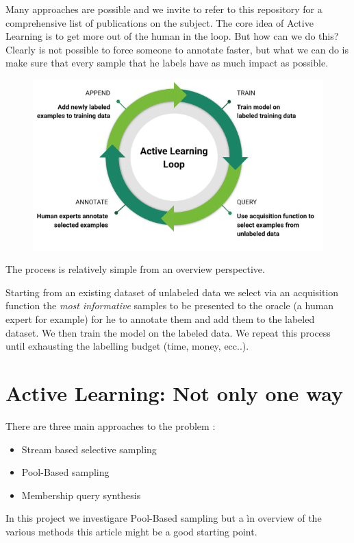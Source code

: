 \documentclass{article}
\begin{document}
\begin{flushleft}
Many approaches are possible and we invite to refer to this repository for a comprehensive list of publications on the subject.
The core idea of Active Learning is to get more out of the human in the loop.
But how can we do this?
Clearly is not possible to force someone to annotate faster, but what we can do is make sure 
that every sample that he labels have as much impact as possible.


\begin{figure}[h]
    \centering
    \includegraphics[scale=0.5]{AL-loop}
\end{figure}

The process is relatively simple from an overview perspective.

Starting from an existing dataset of unlabeled data we select via an acquisition 
function the \emph{most informative} samples to be presented to the oracle (a human expert for example) 
for he to annotate them and add them to the labeled dataset. We then train the model on the labeled data. 
We repeat this process until exhausting the labelling budget (time, money, ecc..).

\section*{Active Learning: Not only one way}
There are three main approaches to the problem :
\begin{itemize}
    \item Stream based selective sampling
    \item Pool-Based sampling
    \item Membership query synthesis
\end{itemize}
In this project we investigare Pool-Based sampling but a ìn overview of the various methods this article might be a good starting point.


\end{flushleft}
\end{document}
